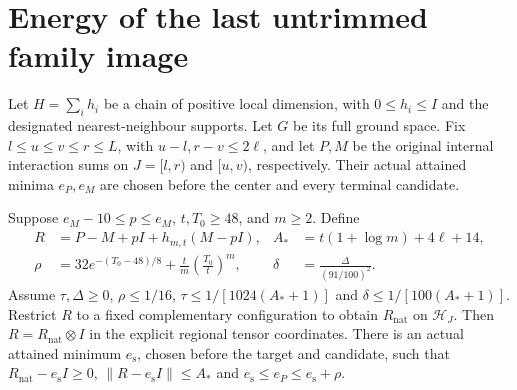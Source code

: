 \section{Energy of the last untrimmed family image}

\begin{lemma}
    \label{thm:soft_terminal_compressed_energy}
    \leanok
    Let $H=\sum_i h_i$ be a chain of positive local dimension, with
    $0\le h_i\le I$ and the designated nearest-neighbour supports.
    Let $G$ be its full ground space. Fix $l\le u\le v\le r\le L$,
    with $u-l,r-v\le2\ell$, and let $P,M$ be the original internal
    interaction sums on $J=[l,r)$ and $[u,v)$, respectively.
    Their actual attained minima $e_P,e_M$ are chosen before the
    center and every terminal candidate.

    Suppose $e_M-10\le p\le e_M$, $t,T_0\ge48$, and $m\ge2$.
    Define
    \begin{align}
        R      & =P-M+pI+h_{m,t}(M-pI),                                     &
        A_*    & =t(1+\log m)+4\ell+14,\label{eq:terminal_soft_operator}      \\
        \rho   & =32e^{-(T_0-48)/8}+\frac tm\left(\frac{T_0}t\right)^m,     &
        \delta & =\frac{\Delta}{(91/100)^2}.\label{eq:terminal_soft_losses}
    \end{align}
    Assume $\tau,\Delta\ge0$, $\rho\le1/16$,
    $\tau\le1/[1024(A_*+1)]$ and $\delta\le1/[100(A_*+1)]$.
    Restrict $R$ to a fixed complementary configuration to obtain
    $R_{\mathrm{nat}}$ on $\mathcal H_J$. Then
    $R=R_{\mathrm{nat}}\otimes I$ in the explicit regional tensor
    coordinates. There is an actual attained minimum $e_{\mathrm s}$,
    chosen before the target and candidate, such that
    $R_{\mathrm{nat}}-e_{\mathrm s}I\ge0$,
    $\|R-e_{\mathrm s}I\|\le A_*$ and
    $e_{\mathrm s}\le e_P\le e_{\mathrm s}+\rho$.


\end{lemma}
